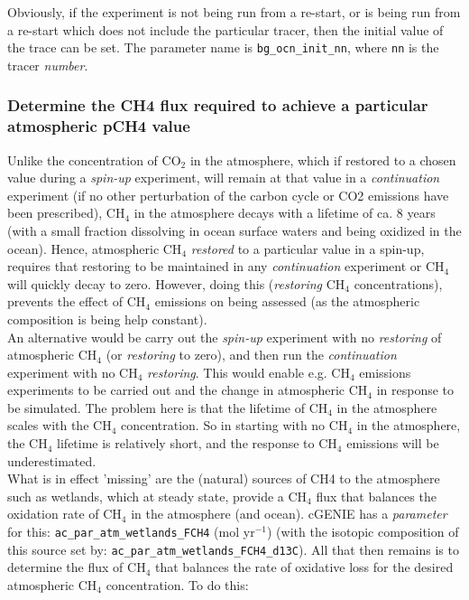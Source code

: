 \documentclass[11pt,fleqn]{book} %
\begin{document}
Obviously, if the experiment is not being run from a re-start, or is being run from a re-start which does not include the particular tracer, then the initial value of the trace can be set. The parameter name is \texttt{bg\_ocn\_init\_nn}, where \texttt{nn} is the tracer \textit{number}.

%
\subsubsection{Determine the CH4 flux required to achieve a particular atmospheric pCH4 value}
\vspace{1mm}

Unlike the concentration of CO\(_{2}\) in the atmosphere, which if restored to a chosen value during a \textit{spin-up} experiment, will remain at that value in a \textit{continuation} experiment (if no other perturbation of the carbon cycle or CO2 emissions have been prescribed), CH\(_{4}\) in the atmosphere decays with a lifetime of ca. 8 years (with a small fraction dissolving in ocean surface waters and being oxidized in the ocean). Hence, atmospheric CH\(_{4}\) \textit{restored} to a particular value in a spin-up, requires that restoring to be maintained in any \textit{continuation} experiment or CH\(_{4}\) will quickly decay to zero. However, doing this (\textit{restoring} CH\(_{4}\) concentrations), prevents the effect of CH\(_{4}\) emissions on being assessed (as the atmospheric composition is being help constant).\\
An alternative would be carry out the \textit{spin-up} experiment with no \textit{restoring} of atmospheric CH\(_{4}\) (or \textit{restoring} to zero), and then run the \textit{continuation} experiment with no CH\(_{4}\) \textit{restoring}. This would enable e.g. CH\(_{4}\) emissions experiments to be carried out and the change in atmospheric CH\(_{4}\) in response to be simulated. The problem here is that the lifetime of  CH\(_{4}\) in the atmosphere scales with the CH\(_{4}\) concentration. So in starting with no CH\(_{4}\) in the atmosphere, the CH\(_{4}\) lifetime is relatively short, and the response to CH\(_{4}\) emissions will be underestimated.\\
What is in effect 'missing' are the (natural) sources of CH4 to the atmosphere such as wetlands, which at steady state, provide a CH\(_{4}\) flux that balances the oxidation rate of CH\(_{4}\) in the atmosphere (and ocean). cGENIE has a \textit{parameter} for this: \texttt{ac\_par\_atm\_wetlands\_FCH4} (mol yr\(^{-1}\)) (with the isotopic composition of this source set by: \texttt{ac\_par\_atm\_wetlands\_FCH4\_d13C}). All that then remains is to determine the flux of CH\(_{4}\) that balances the rate of oxidative loss for the desired atmospheric CH\(_{4}\) concentration. To do this:
\end{document}
